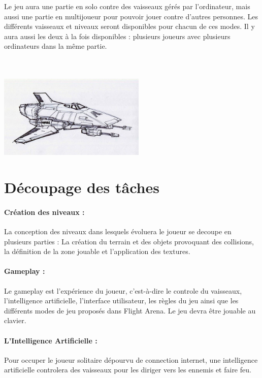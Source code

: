 \documentclass[10pt, titlepage]{report}
\begin{document}
Le jeu aura une partie en solo contre des vaisseaux gérés par l'ordinateur, mais aussi une partie en multijoueur pour pouvoir jouer contre d'autres personnes. Les différents vaisseaux et niveaux seront disponibles pour chacun de ces modes. Il y aura aussi les deux à la fois disponibles : plusieurs joueurs avec plusieurs ordinateurs dans la même partie.
\\ \\ \\
\begin{center}
\includegraphics[height=4cm, width=7cm]{a.jpg}\\
\end{center}

\section{Découpage des tâches}

\paragraph{Création des niveaux :}
La conception des niveaux dans lesquels évoluera le joueur se decoupe en plusieurs parties : La création du terrain et des objets provoquant des collisions, la définition de la zone jouable et l'application des textures.

\paragraph{Gameplay :}
Le gameplay est l'expérience du joueur, c'est-à-dire le controle du vaisseaux, l'intelligence artificielle, l'interface utilisateur, les règles du jeu ainsi que les différents modes de jeu proposés dans Flight Arena.
Le jeu devra être jouable au clavier.

\paragraph{L'Intelligence Artificielle :}
Pour occuper le joueur solitaire dépourvu de connection internet, une intelligence artificielle controlera des vaisseaux pour les diriger vers les ennemis et faire feu.
\end{document}
